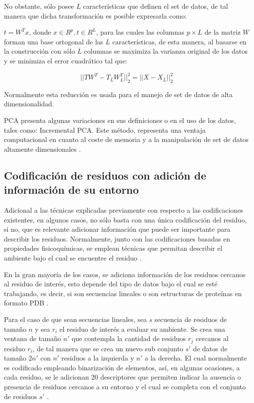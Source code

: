 No obstante, sólo posee $ L $ características que definen el set de datos, de tal manera que dicha transformación es posible expresarla como:

$ t = W^{T}x$, donde $ x \in R^{p}, t \in R^{L}$, para las cuales las columnas $ p \times L $ de la matriz $ W $ forman una base ortogonal de las $ L $ características, de esta manera, al basarse en la construcción con sólo $ L $ columnas se maximiza la varianza original de los datos y se minimiza el error cuadrático tal que: 

\begin{equation}
	|| TW^{T} - T_{L}W_{L}^{T}||^{2}_{2} = ||X - X_{L}||_{2}^{2}
\end{equation}

Normalmente esta reducción es usada para el manejo de set de datos de alta dimensionalidad.

PCA presenta algunas variaciones en sus definiciones o en el uso de los datos, tales como: Incremental PCA. Este método, representa una ventaja computacional en cuanto al coste de memoria y a la manipulación de set de datos altamente dimensionales \cite{artac2002incremental}.

\subsection{Codificación de residuos con adición de información de su entorno}

Adicional a las técnicas explicadas previamente con respecto a las codificaciones existentes, en algunos casos, no sólo basta con una única codificación del residuo, si no, que es relevante adicionar información que puede ser importante para describir los residuos. Normalmente, junto con las codificaciones basadas en propiedades fisicoquímicas, se emplean técnicas que permitan describir el ambiente bajo el cual se encuentre el residuo \cite{masso2008accurate}.

En la gran mayoría de los casos, se adiciona información de los residuos cercanos al residuo de interés, esto depende del tipo de datos bajo el cual se esté trabajando, es decir, si son secuencias lineales o son estructuras de proteínas en formato PDB \cite{capriotti2008three, capriotti2005mutant2}. 

Para el caso de que sean secuencias lineales, sea $s$ secuencia de residuos de tamaño $n$ y sea $r_{i}$ el residuo de interés a evaluar su ambiente. Se crea una ventana de tamaño $n'$ que contempla la cantidad de residuos $r_j$ cercanos al residuo $r_{i}$, de tal manera que se crea un nuevo sub conjunto $s'$ de datos de tamaño $2n'$ con $n'$ residuos a la izquierda y $n'$ a la derecha. El cual normalmente es codificado empleando binarización de elementos, así, en algunas ocasiones, a cada residuo, se le adicionan 20 descriptores que permiten indicar la ausencia o presencia de residuos cercanos a su entorno y el cual se completa con el conjunto de residuos $s'$ \cite{capriotti2008three}.

